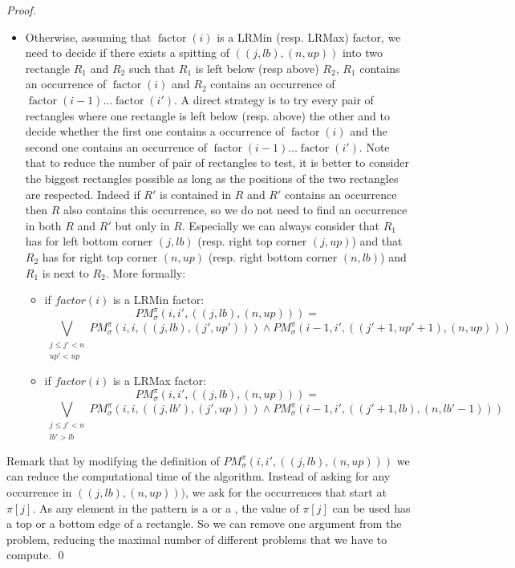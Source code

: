 \documentclass[a4paper]{llncs}
\newcommand{\RLMin}{\text{RLMin}}
\newcommand{\RLMax}{\text{RLMax}}
\newcounter{num}
\newcommand{\PM}{PM}
\DeclareMathOperator{\factor}{factor}
\begin{document}
\begin{proof}
\begin{itemize}
\item Otherwise, assuming that $\factor(i)$ is a LRMin (resp. LRMax) factor,
we need to decide if there exists a spitting of $((j,lb),(n,up))$  into two rectangle $R_1$ and $R_2$ such that
$R_1$ is left below (resp above) $R_2$,
 $R_1$ contains an occurrence of $\factor(i)$
and  $R_2$ contains an occurrence of
$\factor(i-1)\ldots \factor(i')$.
A direct strategy is to try every pair of rectangles where one rectangle is left below (resp. above) the other
and to decide whether the first one contains a occurrence of $\factor(i)$
and the second one contains an occurrence of
$\factor(i-1)\ldots \factor(i')$.
Note that to reduce the number of pair of rectangles to test,
it is better to consider the biggest rectangles possible
as long as the positions of the two rectangles are respected.
Indeed if $R'$ is contained in $R$ and $R'$ contains an occurrence then
$R$ also contains this occurrence,
so we do not
need to find an occurrence in both $R$ and $R'$
but only in $R$.
Especially we can always consider that $R_1$ has for
left bottom corner $(j,lb)$ (resp. right top corner  $(j,up)$)
and that $R_2$ has for right top corner $(n,up)$
(resp. right bottom corner $(n,lb)$)
and $R_1$ is next to $R_2$.
More formally:
\begin{itemize}
\item if $factor(i)$ is a LRMin factor:
$$
\PM^\pi_\sigma(i,i',((j,lb),(n,up))) =
$$
$$
\bigvee_{
\substack{
j\leq j'<n\\ up' < up
}	} \PM^\pi_\sigma(i,i,((j,lb),(j',up'))) \wedge
\PM^\pi_\sigma(i-1,i',((j'+1,up'+1),(n,up)))
$$



\item if $factor(i)$ is a LRMax factor:
$$
\PM^\pi_\sigma(i,i',((j,lb),(n,up))) =
$$
$$
\bigvee_{\substack{
j\leq j'<n \\ lb'>lb
	}	} \PM^\pi_\sigma(i,i,((j,lb'),(j',up))) \wedge
\PM^\pi_\sigma(i-1,i',((j'+1,lb),(n,lb'-1)))
$$
\end{itemize}
\end{itemize}

Remark that by modifying the definition of $\PM^\pi_\sigma(i,i',((j,lb),(n,up)))$
we can reduce the computational time of the algorithm.
Instead of asking for any occurrence in $((j,lb),(n,up)))$,
we ask for the occurrences that start at $\pi[j]$.
As any element in the pattern is a \RLMax or a \RLMin,
the value of $\pi[j]$ can be used has a top or a bottom edge
of a rectangle.
So we can remove one argument from the problem,
reducing the maximal number of different problems that we have to compute.
\qed
\end{proof}
\end{document}
